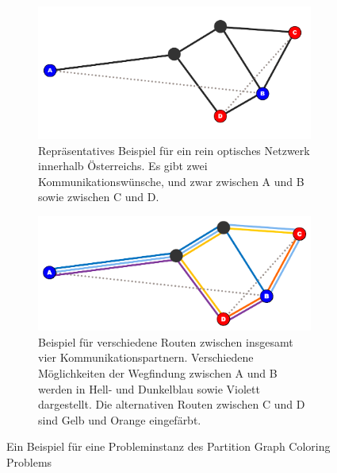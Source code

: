 \begin{figure}
	\centering
	\begin{subfigure}{\textwidth}
		\includegraphics{img/bsp1}
		\caption{Repräsentatives Beispiel für ein rein optisches Netzwerk innerhalb Österreichs. Es gibt zwei Kommunikationswünsche, und zwar zwischen A und B sowie zwischen C und D.}
		\label{fig:example:a}
	\end{subfigure}
	\begin{subfigure}{\textwidth}
		\includegraphics{img/bsp2}
		\caption{Beispiel für verschiedene Routen zwischen insgesamt vier Kommunikationspartnern. Verschiedene Möglichkeiten der Wegfindung zwischen A und B werden in Hell- und Dunkelblau sowie Violett dargestellt. Die alternativen Routen zwischen C und D sind Gelb und Orange eingefärbt.}
		\label{fig:example:b}
	\end{subfigure}
	\caption{Ein Beispiel für eine Probleminstanz des Partition Graph Coloring Problems}
	\label{fix:example}
\end{figure}

